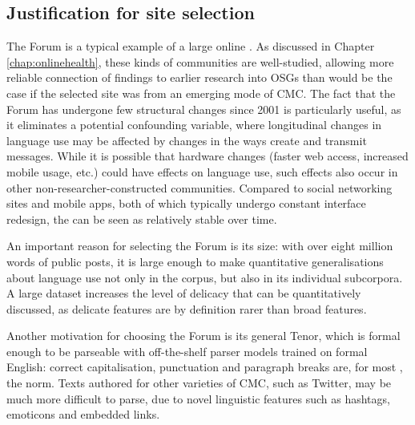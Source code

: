 \subsection{Justification for site selection}

The \gls{Forum} is a typical example of a large online . As discussed in Chapter \ref{chap:onlinehealth}, these kinds of communities are well\hyp{}studied, allowing more reliable connection of findings to earlier research into \glspl{OSG} than would be the case if the selected site was from an emerging \gls{mode} of \gls{CMC}. The fact that the \gls{Forum} has undergone few structural changes since 2001 is particularly useful, as it eliminates a potential confounding variable, where longitudinal changes in language use may be affected by changes in the ways  create and transmit messages. While it is possible that hardware changes (faster web access, increased mobile usage, etc.) could have effects on language use, such effects also occur in other non\hyp{}researcher\hyp{}constructed communities. Compared to social networking sites and mobile apps, both of which typically undergo constant interface redesign, the  can be seen as relatively stable over time.

An important reason for selecting the \gls{Forum} is its size: with over eight million words of public \glspl{post}, it is large enough to make quantitative generalisations about language use not only in the \gls{corpus}, but also in its individual subcorpora. A large dataset increases the level of delicacy that can be quantitatively discussed, as delicate features are by definition rarer than broad features.

Another motivation for choosing the \gls{Forum} is its general Tenor, which is formal enough to be parseable with off\hyp{}the\hyp{}shelf parser models trained on formal English: correct capitalisation, punctuation and paragraph breaks are, for most , the norm. Texts authored for other varieties of \gls{CMC}, such as Twitter, may be much more difficult to parse, due to novel linguistic features such as hashtags, emoticons and embedded links.


